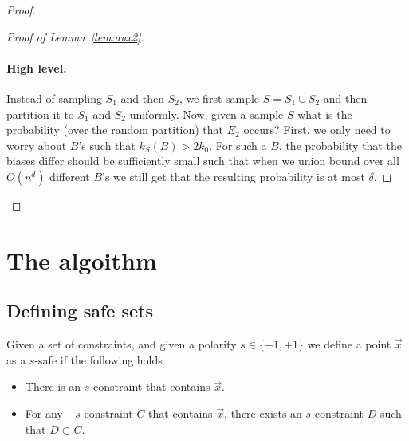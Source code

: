 \documentclass{article}
\newcommand{\x}{\vec{x}}
\newcommand{\bias}{\text{bias}}
\newcommand{\samp}{S}
\begin{document}
\begin{proof}
\begin{proof}[Proof of Lemma~\ref{lem:aux2}]\ \\
\paragraph{High level.}
Instead of sampling $S_1$ and then $S_2$,
we first sample $S=S_1\cup S_2$ and 
then partition it to $S_1$ and $S_2$ uniformly.
Now, given a sample $S$ what is the probability (over the random partition)
that $E_2$ occurs?
First, we only need to worry about $B$'s such that $k_S(B) > 2k_0$.
For such a $B$, the probability that the biases differ should be sufficiently
small such that when we union bound over all $O(n^d)$ different $B$'s
we still get that the resulting probability is at most $\delta$.

\end{proof}

%

\iffalse
Further assume that $\bias(B) = 0.8$,  that $\bias_{\samp_1}(B)=0$, and that $k_1(B)$
is sufficiently large so the $\lvert \bias_{\samp_1}(B) -  \bias(B)\rvert \geq \sqrt{\frac{100d\log n + \log(1/\delta)}{k_1(B)} }$.
Now, since $p(B) \leq 1/1000n$ it follows that $k_2(B)=0$ with probability at least $0.99$.
Now, it is plausible to define $\bias_{\samp_2}(B)=0$ when $k_2(B)=0$,
and therefore we get that $\bias_{\samp_2}=\bias_{\samp_1}=0$ with probability at least $0.99$ and so the event $E_2$ occurs with probability less than $0.01$,
unlike what we wanted.
\fi
\end{proof}

\section{The algoithm}

\subsection{Defining safe sets}

Given a set of constraints, and given a polarity  $s \in
\{-1,+1\}$ we define a point $\x$ as a $s$-safe if
the following holds
\begin{itemize}
\item There is an $s$ constraint that contains $\x$.
\item For any $-s$ constraint $C$ that contains $\x$, there exists an
  $s$ constraint $D$ such that $D \subset C$. 
\end{itemize}
\end{document}
